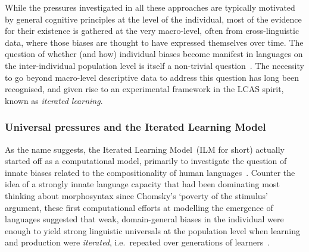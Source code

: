 While the pressures investigated in all these approaches are typically motivated by general cognitive principles at the level of the individual, most of the evidence for their existence is gathered at the very macro-level, often from cross-linguistic data, where those biases are thought to have expressed themselves over time. The question of whether (and how) individual biases become manifest in languages on the inter-individual population level is itself a non-trivial question~\citep{Kirby1999}. The necessity to go beyond macro-level descriptive data to address this question has long been recognised, and given rise to an experimental framework in the LCAS spirit, known as \emph{iterated learning}.



\subsubsection{Universal pressures and the Iterated Learning Model}
\label{sec:ilm}

As the name suggests, the Iterated Learning Model~(ILM for short) actually started off as a computational model, primarily to investigate the question of innate biases related to the compositionality of human languages~\citep{Kirby2000,Brighton2002,Kirby2002}. Counter the idea of a strongly innate language capacity that had been dominating most thinking about morphosyntax since Chomsky's `poverty of the stimulus' argument, these first computational efforts at modelling the emergence of languages %
suggested that weak, domain-general biases in the individual were enough to yield strong linguistic universals at the population level when learning and production were \emph{iterated}, i.e.~repeated over generations of learners~\citep{Kirby2004}.

